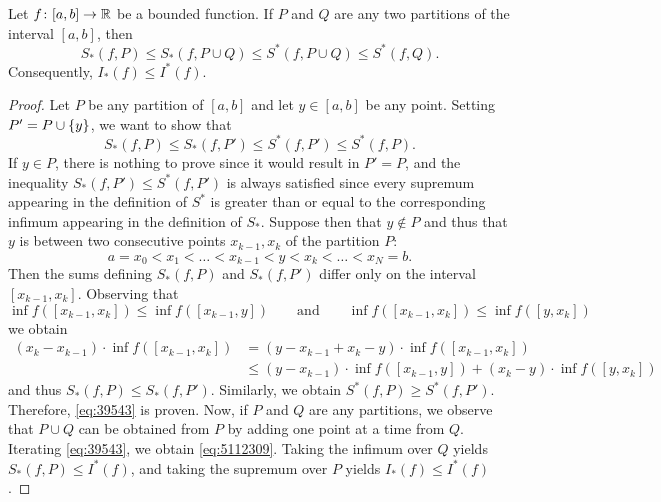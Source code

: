 \begin{lemma}
Let $f\colon[a,b]\to {\mathbb R}$ be a bounded function.
If $P$ and $Q$ are any two partitions of the interval
$[a,b]$, then
\begin{equation}\label{eq:5112309}
  S_*(f,P) \le S_*(f,P\cup Q)\le S^*(f,P\cup Q) \le S^*(f,Q).
\end{equation}
Consequently, $I_*(f) \le I^*(f)$.
\end{lemma}
\begin{proof}
    Let $P$ be any partition of $[a,b]$ and let $y\in [a,b]$ be any point.
  Setting $P' = P \cup {\left\{ y \right\}}$, we want to show
  that
  \begin{equation}\label{eq:39543}
    S_*(f,P) \le S_*(f,P') \le S^*(f,P') \le S^*(f,P).
  \end{equation}
  If $y\in P$, there is nothing to prove since
    it would result in $P'=P$, and the inequality $S_*(f,P') \le S^*(f,P')$ is
  always satisfied since every supremum appearing in the definition of $S^*$ is
  greater than or equal to the corresponding
  infimum appearing in the definition of $S_*$.
    Suppose then that $y \not \in P$ and thus that $y$ is between two
  consecutive points $x_{k-1}, x_k$ of the partition $P$:
  \[
    a= x_0 < x_1 < \dots < x_{k-1} < y < x_k < \dots < x_N=b.
  \]
  Then the sums defining $S_*(f,P)$ and $S_*(f,P')$ 
  differ only on the interval $[x_{k-1},x_k]$. 
  Observing that
  \[
  \inf f([x_{k-1}, x_k])
  \le \inf f([x_{k-1},y])
  \qquad \text{and} \qquad
  \inf f([x_{k-1}, x_k])
  \le \inf f([y,x_k])
  \]
  we obtain 
  \begin{align*}
    (x_k - x_{k-1})\cdot \inf f([x_{k-1}, x_k])
    & = (y - x_{k-1} + x_k - y)\cdot \inf f([x_{k-1}, x_k]) \\
    & \le (y-x_{k-1})\cdot \inf f([x_{k-1},y]) + (x_k - y)\cdot \inf f([y,x_k])
  \end{align*}
  and thus $S_*(f,P) \le S_*(f,P')$.
  Similarly, we obtain $S^*(f,P) \ge S^*(f,P')$.
  Therefore, \eqref{eq:39543} is proven.
  Now, if $P$ and $Q$ are any partitions, we observe that $P\cup Q$ 
  can be obtained from $P$ by adding one point at a time from $Q$. 
  Iterating \eqref{eq:39543}, we obtain \eqref{eq:5112309}.
  Taking the infimum over $Q$
  yields $S_*(f,P) \le I^*(f)$, and taking the supremum over 
  $P$ yields $I_*(f) \le I^*(f)$.
  \end{proof}


